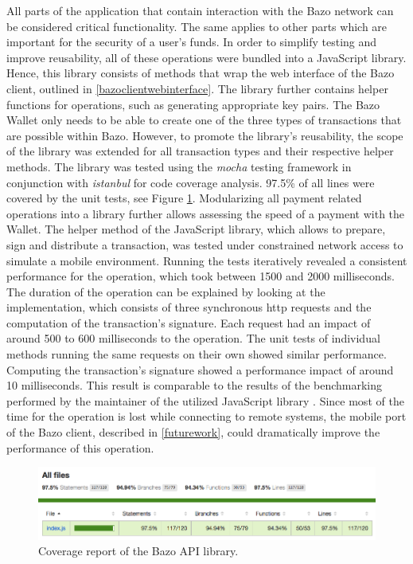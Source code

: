 All parts of the application that contain interaction with the Bazo network can be considered critical functionality. The same applies to other parts which are important for the security of a user's funds. In order to simplify testing and improve reusability, all of these operations were bundled into a JavaScript library. Hence, this library consists of methods that wrap the web interface of the Bazo client, outlined in \ref{bazoclientwebinterface}. The library further contains helper functions for operations, such as generating appropriate key pairs. The Bazo Wallet only needs to be able to create one of the three types of transactions that are possible within Bazo. However, to promote the library's reusability, the scope of the library was extended for all transaction types and their respective helper methods.
The library was tested using the \textit{mocha} testing framework in conjunction with \textit{istanbul} for code coverage analysis. 97.5\% of all lines were covered by the unit tests, see Figure \ref{fig:coverage}. Modularizing all payment related operations into a library further allows assessing the speed of a payment with the Wallet. The helper method of the JavaScript library, which allows to prepare, sign and distribute a transaction, was tested under constrained network access to simulate a mobile environment. Running the tests iteratively revealed a consistent performance for the operation, which took between 1500 and 2000 milliseconds. The duration of the operation can be explained by looking at the implementation, which consists of three synchronous http requests and the computation of the transaction's signature. Each request had an impact of around 500 to 600 milliseconds to the operation. The unit tests of individual methods running the same requests on their own showed similar performance. Computing the transaction's signature showed a performance impact of around 10 milliseconds. This result is comparable to the results of the benchmarking performed by the maintainer of the utilized JavaScript library \cite{elliptic}.
Since most of the time for the operation is lost while connecting to remote systems, the mobile port of the Bazo client, described in \ref{futurework}, could dramatically improve the performance of this operation.

\begin{figure}
\centering
\includegraphics[width=1\textwidth]{screenshots/bazo-api-testing.png}
\caption{\label{fig:coverage}Coverage report of the Bazo API library.}
\end{figure}

